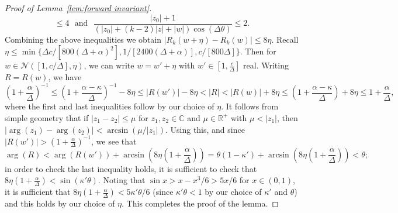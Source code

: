 \begin{proof}[Proof of Lemma~\ref{lem:forward invariant}]
\[\leq 4
 \:\:\:\text{and}\:\:\:
\frac{|z_0| +  1}{(|z_0| + (k-2)|z| + |w|)\cos(\Delta \theta)}
\leq 2.
\]
Combining the above inequalities we obtain $|R_k(w + \eta) - R_k(w)| \leq 8 \eta$. Recall $\eta \leq \min\{\Delta c / [800(\Delta + \alpha)^2], 1/[2400(\Delta+ \alpha)], c / [800 \Delta]\}$.
Then for $w\in \mathcal{N}([1,c/\Delta],\eta)$, we can write $w = w' + \eta$ with $w' \in [1,  \frac{c}{\Delta}]$ real. Writing $R = R(w)$, we have 
\[\left( 1 + \frac{\alpha}{\Delta} \right)^{-1}
\leq \left( 1 + \frac{\alpha - \kappa}{\Delta} \right)^{-1} - 8\eta
\leq |R(w')| - 8\eta
<|R| < |R(w)| + 8\eta 
\leq \left( 1 + \frac{\alpha - \kappa}{\Delta} \right) + 8\eta
\leq 
1 + \frac{\alpha}{\Delta},
\]
where the first and last inequalities follow by our choice of $\eta$.
%
It follows from simple geometry that if $|z_1 - z_2| \leq \mu$ for $z_1, z_2 \in \mathbb{C}$ and $\mu \in \mathbb{R}^+$ with $\mu < |z_1|$, then $|\arg(z_1) - \arg(z_2)| < \arcsin(\mu / |z_1|)$. Using this, and since $|R(w')|> (1 + \frac{\alpha}{\Delta})^{-1}$, we see that 
\[
\arg(R) < \arg(R(w')) + \arcsin\left( 8 \eta \left(1 + \frac{\alpha}{\Delta} \right) \right) = \theta(1 - \kappa')  + \arcsin\left( 8 \eta \left(1 + \frac{\alpha}{\Delta} \right) \right) < \theta;
\]
in order to check the last inequality holds, it is sufficient 
to check that $8 \eta (1 + \frac{\alpha}{\Delta}) < \sin(\kappa' \theta)$. 
Noting that $\sin x > x - x^3/6 > 5x/6$ for $x \in (0,1)$, 
it is sufficient that $ 8 \eta (1 + \frac{\alpha}{\Delta}) < 5\kappa'\theta / 6 $ (since $\kappa' \theta <1$ by our choice of $\kappa'$ and $\theta$) and this holds by our choice of $\eta$. This completes the proof of the lemma.
\end{proof}
%
